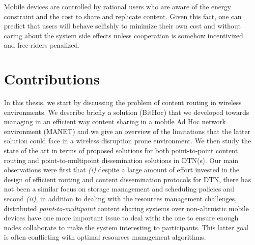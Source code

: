 Mobile devices are controlled by rational users who are aware of the energy constraint and the cost to share and replicate content. Given this fact, one can predict that users will behave selfishly to minimize their own cost and without caring about the system side effects unless cooperation is somehow incentivized and free-riders penalized. 

\section{Contributions}

In this thesis, we start by discussing the problem of content routing in wireless environments. We describe briefly a solution (BitHoc) that we developed towards managing in an efficient way content sharing in a mobile Ad Hoc network environment (MANET) and we give an overview of the limitations that the latter solution could face in a wireless disruption prone environment. We then study the state of the art in terms of proposed solutions for both point-to-point content routing and point-to-multipoint dissemination solutions in DTN(s). Our main observations were first that \emph{(i)} despite a large amount of effort invested in the design of efficient routing and content dissemination protocols for DTN, there has not been a similar focus on storage management and scheduling policies and second \emph{(ii)}, in addition to dealing with the resources management challenges, distributed \emph{point-to-multipoint} content sharing systems over non-altruistic mobile devices have one more important issue to deal with: the one to ensure enough nodes collaborate to make the system interesting to participants. This latter goal is often conflicting with optimal resources management algorithms. 

